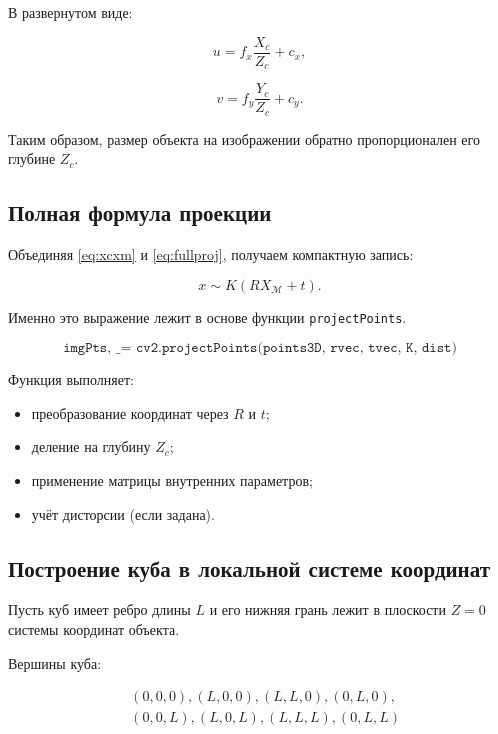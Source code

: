 \documentclass[a4paper,12pt]{article}
\begin{document}
В развернутом виде:

\begin{equation}
u = f_x \frac{X_c}{Z_c} + c_x,
\end{equation}

\begin{equation}
v = f_y \frac{Y_c}{Z_c} + c_y.
\end{equation}

Таким образом, размер объекта на изображении обратно пропорционален его глубине $Z_c$.

\subsection*{Полная формула проекции}

Объединяя \eqref{eq:xcxm} и \eqref{eq:fullproj}, получаем компактную запись:

\begin{equation}
x \sim K (R X_{\mathcal{M}} + t).
\label{eq:worldtoimage}
\end{equation}

Именно это выражение лежит в основе функции \texttt{projectPoints}.

\begin{equation*}
\texttt{imgPts, \_ = cv2.projectPoints(points3D, rvec, tvec, K, dist)}
\end{equation*}

Функция выполняет:

\begin{itemize}
    \item преобразование координат через $R$ и $t$;
    \item деление на глубину $Z_c$;
    \item применение матрицы внутренних параметров;
    \item учёт дисторсии (если задана).
\end{itemize}

\subsection*{Построение куба в локальной системе координат}

Пусть куб имеет ребро длины $L$ и его нижняя грань лежит в плоскости $Z=0$ системы координат объекта.

Вершины куба:

\begin{equation}
\begin{aligned}
&(0,0,0), (L,0,0), (L,L,0), (0,L,0), \\
&(0,0,L), (L,0,L), (L,L,L), (0,L,L)
\end{aligned}
\label{eq:cube}
\end{equation}
\end{document}
